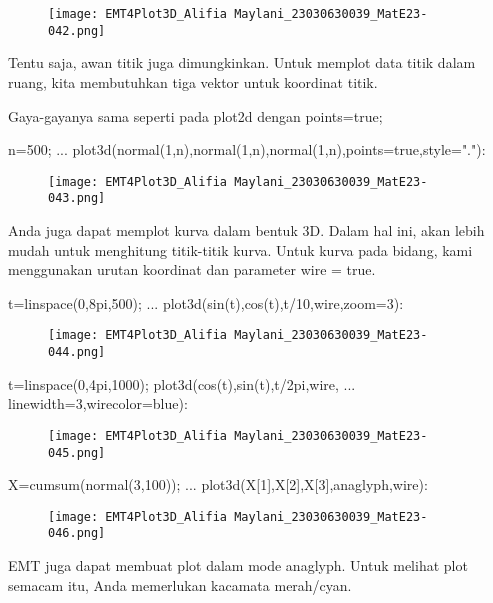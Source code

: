 \documentclass{article}
\begin{document}
\begin{figure}
    \centering
    \texttt{[image: EMT4Plot3D\_Alifia Maylani\_23030630039\_MatE23-042.png]}
    \caption{}
    \label{fig:enter-label}
\end{figure}

Tentu saja, awan titik juga dimungkinkan. Untuk memplot data titik
dalam ruang, kita membutuhkan tiga vektor untuk koordinat titik.


Gaya-gayanya sama seperti pada plot2d dengan points=true;


\>n=500;  ...  
\>     plot3d(normal(1,n),normal(1,n),normal(1,n),points=true,style="."):


\begin{figure}
    \centering
    \texttt{[image: EMT4Plot3D\_Alifia Maylani\_23030630039\_MatE23-043.png]}
    \caption{}
    \label{fig:enter-label}
\end{figure}

Anda juga dapat memplot kurva dalam bentuk 3D. Dalam hal ini, akan
lebih mudah untuk menghitung titik-titik kurva. Untuk kurva pada
bidang, kami menggunakan urutan koordinat dan parameter wire = true.


\>t=linspace(0,8pi,500); ...  
\>   plot3d(sin(t),cos(t),t/10,\>wire,zoom=3):


\begin{figure}
    \centering
    \texttt{[image: EMT4Plot3D\_Alifia Maylani\_23030630039\_MatE23-044.png]}
    \caption{}
    \label{fig:enter-label}
\end{figure}

\>t=linspace(0,4pi,1000); plot3d(cos(t),sin(t),t/2pi,\>wire, ...  
\>   linewidth=3,wirecolor=blue):


\begin{figure}
    \centering
    \texttt{[image: EMT4Plot3D\_Alifia Maylani\_23030630039\_MatE23-045.png]}
    \caption{}
    \label{fig:enter-label}
\end{figure}

\>X=cumsum(normal(3,100)); ...  
\>    plot3d(X[1],X[2],X[3],\>anaglyph,\>wire):


\begin{figure}
    \centering
    \texttt{[image: EMT4Plot3D\_Alifia Maylani\_23030630039\_MatE23-046.png]}
    \caption{}
    \label{fig:enter-label}
\end{figure}

EMT juga dapat membuat plot dalam mode anaglyph. Untuk melihat plot
semacam itu, Anda memerlukan kacamata merah/cyan.
\end{document}
